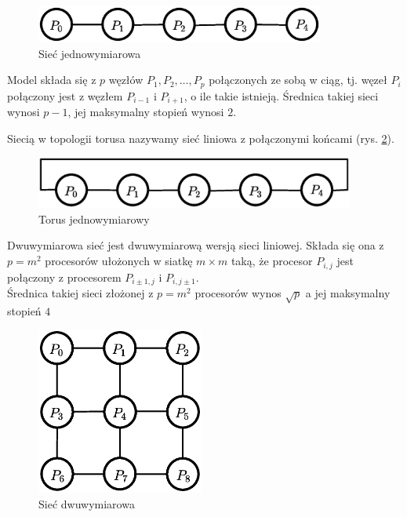 \begin{przyklad}
\begin{figure}[h]
\centering
\includegraphics[width=9.5cm]{images/mesh1d}
\caption{Sieć jednowymiarowa}
\label{fig:model_mesh1d}
\end{figure}
Model składa się z \(p\) węzłów \(P_1, P_2, \dots, P_p\) połączonych ze sobą w ciąg, tj. węzeł \(P_i\) połączony jest z węzłem \(P_{i-1}\) i \(P_{i+1}\), o ile takie istnieją. Średnica takiej sieci wynosi \(p-1\), jej maksymalny stopień wynosi \(2\).\\
\end{przyklad}

\begin{przyklad}[Torus]
Siecią w topologii torusa nazywamy sieć liniowa z połączonymi końcami (rys. \ref{fig:model_torus1d}).
\begin{figure}[h]
\centering
\includegraphics[width=10.5cm]{images/torus1d}
\caption{Torus jednowymiarowy}
\label{fig:model_torus1d}
\end{figure}

\end{przyklad}

\begin{przyklad}
Dwuwymiarowa sieć jest dwuwymiarową wersją sieci liniowej. Składa się ona z \(p=m^2\) procesorów ułożonych w siatkę \(m\times m\) taką, że procesor \(P_{i,j}\) jest połączony z procesorem \(P_{i\pm 1, j}\) i \(P_{i, j\pm 1}\).\\
Średnica takiej sieci złożonej z \(p=m^2\) procesorów wynos \(\sqrt{p}\) a jej maksymalny stopień \(4\)
\begin{figure}[h]
\centering
\includegraphics[width=5.5cm]{images/mesh2d}
\caption{Sieć dwuwymiarowa}
\label{fig:model_mesh2d}
\end{figure}
\end{przyklad}

